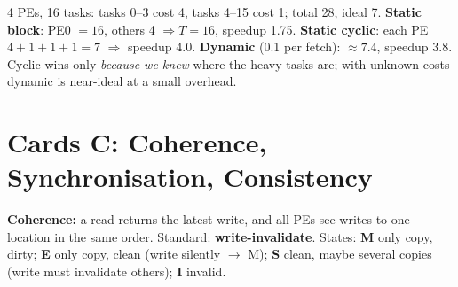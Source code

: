 \begin{ex}
4 PEs, 16 tasks: tasks 0--3 cost 4, tasks 4--15 cost 1; total 28, ideal 7. \textbf{Static block}: PE0 $=16$, others 4 $\Rightarrow T=16$, speedup 1.75. \textbf{Static cyclic}: each PE $4+1+1+1=7$ $\Rightarrow$ speedup 4.0. \textbf{Dynamic} (0.1 per fetch): $\approx7.4$, speedup 3.8. Cyclic wins only \emph{because we knew} where the heavy tasks are; with unknown costs dynamic is near-ideal at a small overhead.
\end{ex}

\section{Cards C: Coherence, Synchronisation, Consistency}\label{grp:coh}
\textbf{Coherence:} a read returns the latest write, and all PEs see writes to one location in the same order. Standard: \textbf{write-invalidate}. States: \textbf{M} only copy, dirty; \textbf{E} only copy, clean (write silently $\rightarrow$ M); \textbf{S} clean, maybe several copies (write must invalidate others); \textbf{I} invalid.
